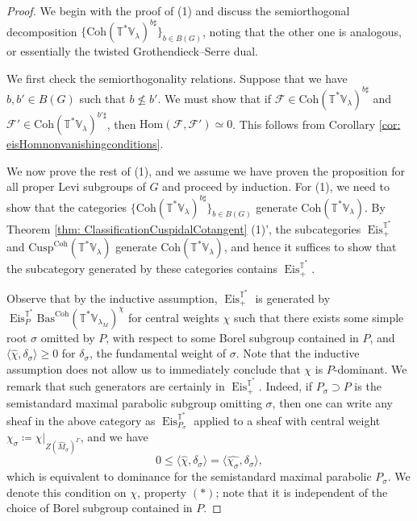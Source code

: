 \documentclass{amsart}
\theoremstyle{definition}
\theoremstyle{remark}
\numberwithin{equation}{section}
\newcommand{\mc}{\mathcal}
\newcommand{\Hom}{\mathrm{Hom}}
\newcommand{\wh}{\widehat}
\DeclareMathOperator{\Eis}{\mathrm{Eis}}
\newcommand{\Coh}{\mathrm{Coh}}
\newcommand{\Cusp}{\mathrm{Cusp}}
\newcommand{\V}{\mathbb{V}}
\newcommand{\T}{\mathbb{T}}
\newcommand{\Bas}{\mathrm{Bas}}
\begin{document}
\begin{proof}
We begin with the proof of (1) and discuss the semiorthogonal decomposition $\{\Coh(\T^*\V_\lambda)^{b\sharp}\}_{b\in B(G)}$, noting that the other one is analogous, or essentially the twisted Grothendieck--Serre dual. 

We first check the semiorthogonality relations. Suppose that we have $b, b' \in B(G)$ such that $b \nleq b'$. We must show that if $\mc{F} \in \Coh(\T^{\ast}\V_\lambda)^{b \sharp}$ and $\mc{F}' \in \Coh(\T^{\ast}\V_\lambda)^{b' \sharp}$, then $\Hom(\mc{F}, \mc{F}') \simeq 0$. This follows from Corollary \ref{cor: eisHomnonvanishingconditions}. 

We now prove the rest of (1), and we assume we have proven the proposition for all proper Levi subgroups of $G$ and proceed by induction. For (1), we need to show that the categories $\{\Coh(\T^{\ast}\V_{\lambda})^{b\sharp}\}_{b \in B(G)}$ generate $\Coh(\T^{\ast}\V_{\lambda})$. By Theorem \ref{thm: ClassificationCuspidalCotangent} (1)', the subcategories $\Eis^{\T^{\ast}}_+$ and $\Cusp^{\Coh}(\T^{\ast}\V_{\lambda})$ generate $\Coh(\T^{\ast}\V_{\lambda})$, and hence it suffices to show that the subcategory generated by these categories contains $\Eis_+^{\T^*}$. 

Observe that by the inductive assumption, $\Eis_+^{\T^*}$ is generated by $\Eis^{\T^{\ast}}_P \Bas^\Coh(\T^{\ast}\V_{\lambda_M})^{\chi}$ for central weights $\chi$ such that there exists some simple root $\sigma$ omitted by $P$, with respect to some Borel subgroup contained in $P$, and $\langle \wh{\chi}, \delta_{\sigma} \rangle \geq 0$ for $\delta_{\sigma}$, the fundamental weight of $\sigma$. Note that the inductive assumption does not allow us to immediately conclude that $\chi$ is $P$-dominant. We remark that such generators are certainly in $\Eis_+^{\T^*}$. Indeed, if $P_{\sigma} \supset P$ is the semistandard maximal parabolic subgroup omitting $\sigma$, then one can write any sheaf in the above category as $\Eis^{\T^{\ast}}_{P_{\sigma}}$ applied to a sheaf with central weight $\chi_\sigma\coloneq\chi|_{Z(\wh{M}_{\sigma})^{\Gamma}}$, and we have
\begin{equation*}
    0 \leq \langle \wh{\chi}, \delta_{\sigma} \rangle = \langle \wh{\chi_\sigma}, \delta_{\sigma} \rangle,
\end{equation*}
which is equivalent to dominance for the semistandard maximal parabolic $P_{\sigma}$. We denote this condition on $\chi$, property $(\bm{\ast})$; note that it is independent of the choice of Borel subgroup contained in $P$. 


\end{proof}
\end{document}

